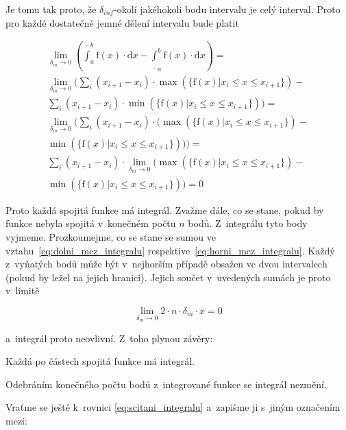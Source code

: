 Je tomu tak proto, že \(\delta_{inf}\)-okolí jakéhokoli bodu intervalu je celý interval. Proto pro každé dostatečně jemné dělení intervalu bude platit

\begin{equation}
\begin{split}
\lim_{\delta_m \to 0} \left( \overline{\int}_a^b \mathrm{f}(x) \cdot \mathrm{d}x - \underline{\int}_a^b \mathrm{f}(x) \cdot \mathrm{d}x \right) = \\
\lim_{\delta_m \to 0} \Bigg( \sum_{i} (x_{i+1} - x_i) \cdot \max(\{\mathrm{f}(x) | x_i \leq x \leq x_{i+1}\}) - \\
\sum_{i} (x_{i+1} - x_i) \cdot \min(\{\mathrm{f}(x) | x_i \leq x \leq x_{i+1}\}) \Bigg) = \\
\lim_{\delta_m \to 0} \Bigg( \sum_{i} (x_{i+1} - x_i) \cdot (\max(\{\mathrm{f}(x) | x_i \leq x \leq x_{i+1}\}) - \\
\min(\{\mathrm{f}(x) | x_i \leq x \leq x_{i+1}\})) \Bigg) = \\
\sum_{i} (x_{i+1} - x_i) \cdot \lim_{\delta_m \to 0} (\max(\{\mathrm{f}(x) | x_i \leq x \leq x_{i+1}\}) - \\
\min(\{\mathrm{f}(x) | x_i \leq x \leq x_{i+1}\})) = 0
\end{split}
\end{equation}

Proto každá spojitá funkce má integrál. Zvažme dále, co se stane, pokud by funkce nebyla spojitá v~konečném počtu \(n\) bodů. Z~integrálu tyto body vyjmeme. Prozkoumejme, co se stane se sumou ve vztahu~\eqref{eq:dolni_mez_integralu} respektive~\eqref{eq:horni_mez_integralu}. Každý z~vyňatých bodů může být v~nejhorším případě obsažen ve dvou intervalech (pokud by ležel na jejich hranici). Jejich součet v~uvedených sumách je proto v~limitě

\begin{equation}
\lim_{\delta_m \to 0} 2 \cdot n \cdot \delta_m \cdot x = 0 
\end{equation}

a~integrál proto neovlivní. Z~toho plynou závěry:

\begin{fact}
Každá po částech spojitá funkce má integrál.
\end{fact}

\begin{fact}
Odebráním konečného počtu bodů z~integrované funkce se integrál nezmění.
\end{fact}

Vraťme se ještě k~rovnici \eqref{eq:scitani_integralu} a~zapišme ji s~jiným označením mezí: 

